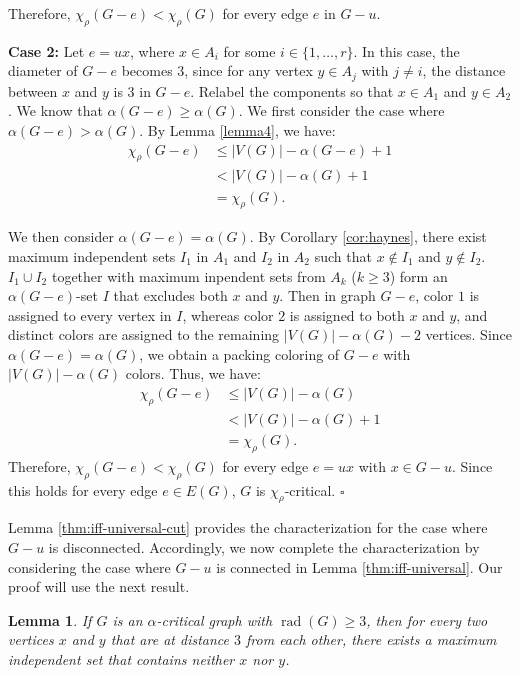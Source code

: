 \documentclass[12pt]{article}
\newtheorem{lemma}[theorem]{Lemma}
\newcommand{\qed}{\hfill $\square$ \bigskip}
\begin{document}
Therefore, $\chi_\rho(G-e) < \chi_\rho(G)$ for every edge $e$ in $G-u$.

\textbf{Case 2:} Let \( e = ux \), where \( x \in A_i \)  for some $i \in \{1,\dots,r\}$. In this case, the diameter of \( G - e \) becomes 3, since for any vertex \( y \in A_j \) with \( j \neq i \), the distance between \( x \) and \( y \) is 3 in \( G - e \). Relabel the components so that $x \in A_1$ and $y \in A_2$. We know that $\alpha(G-e) \geq \alpha(G)$.
We first consider the case where $\alpha(G-e)>\alpha(G)$. By Lemma \ref{lemma4}, we have: 
\begin{align*}
\chi_\rho(G-e)&\leq|V(G)|-\alpha(G-e)+1 \\&<|V(G)|-\alpha(G)+1 \\ &=\chi_\rho(G).
\end{align*}
	
We then consider \( \alpha(G - e) = \alpha(G) \). By Corollary \ref{cor:haynes}, there exist maximum independent sets \( I_1 \) in \( A_1 \) and \( I_2 \) in \( A_2 \) such that \( x \notin I_1 \) and \( y \notin I_2 \). $I_1 \cup I_2$ together with maximum inpendent sets from $A_k$ ($k\geq3$) form an \( \alpha(G - e) \)-set $I$ that excludes both \( x \) and \( y \).
Then in graph $G-e$, color $1$ is assigned to every vertex in $I$, whereas color $2$ is assigned to both $x$ and $y$, and distinct colors are assigned to the remaining $|V(G)|-\alpha(G)-2$ vertices. Since $\alpha(G-e)=\alpha(G)$, we obtain a packing coloring of $G-e$ with $|V(G)|-\alpha(G)$ colors. Thus, we have:
\begin{align*}
\chi_\rho(G-e)&\le|V(G)|-\alpha(G) \\&<|V(G)|-\alpha(G)+1 \\ &=\chi_\rho(G). 
\end{align*}
Therefore, $\chi_\rho(G-e) < \chi_\rho(G)$ for every edge $e=ux$ with $x \in G-u$. Since this holds for every edge $e \in E(G)$, $G$ is $\chi_\rho$-critical.
\qed

Lemma \ref{thm:iff-universal-cut} provides the characterization for the case where $G-u$ is disconnected. Accordingly, we now complete the characterization by considering the case where $G-u$ is connected in Lemma \ref{thm:iff-universal}. Our proof will use the next result. 

\begin{lemma}\label{lem:rad3}
If $G$ is an $\alpha$-critical graph with $\operatorname{rad}(G)\ge 3$, then for every two vertices $x$ and $y$ that are at distance $3$ from each other, there exists a maximum independent set that contains neither $x$ nor $y$.
\end{lemma}
\end{document}
